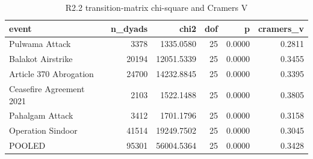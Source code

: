 \begin{table}
\caption{R2.2 transition-matrix chi-square and Cramers V}
\label{tab:r1r2_transition_stats}
\begin{tabular}{lrrrrr}
\toprule
event & n\_dyads & chi2 & dof & p & cramers\_v \\
\midrule
Pulwama Attack & 3378 & 1335.0580 & 25 & 0.0000 & 0.2811 \\
Balakot Airstrike & 20194 & 12051.5339 & 25 & 0.0000 & 0.3455 \\
Article 370 Abrogation & 24700 & 14232.8845 & 25 & 0.0000 & 0.3395 \\
Ceasefire Agreement 2021 & 2103 & 1522.1488 & 25 & 0.0000 & 0.3805 \\
Pahalgam Attack & 3412 & 1701.1796 & 25 & 0.0000 & 0.3158 \\
Operation Sindoor & 41514 & 19249.7502 & 25 & 0.0000 & 0.3045 \\
POOLED & 95301 & 56004.5364 & 25 & 0.0000 & 0.3428 \\
\bottomrule
\end{tabular}
\end{table}
